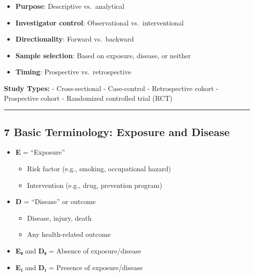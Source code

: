 \documentclass[
  letterpaper,
  DIV=11,
  numbers=noendperiod]{scrartcl}
\providecommand{\tightlist}{%
  \setlength{\itemsep}{0pt}\setlength{\parskip}{0pt}}
\begin{document}
\begin{itemize}
\tightlist
\item
  \textbf{Purpose}: Descriptive vs.~analytical
\item
  \textbf{Investigator control}: Observational vs.~interventional
\item
  \textbf{Directionality}: Forward vs.~backward
\item
  \textbf{Sample selection}: Based on exposure, disease, or neither
\item
  \textbf{Timing}: Prospective vs.~retrospective
\end{itemize}

\textbf{Study Types:} - Cross-sectional - Case-control - Retrospective
cohort - Prospective cohort - Randomized controlled trial (RCT)

\begin{center}\rule{0.5\linewidth}{0.5pt}\end{center}

\subsection{\texorpdfstring{{7} {Basic Terminology: Exposure and
Disease}}{7 Basic Terminology: Exposure and Disease}}\label{basic-terminology-exposure-and-disease}

\begin{itemize}
\tightlist
\item
  \textbf{E} = ``Exposure''

  \begin{itemize}
  \tightlist
  \item
    Risk factor (e.g., smoking, occupational hazard)
  \item
    Intervention (e.g., drug, prevention program)
  \end{itemize}
\item
  \textbf{D} = ``Disease'' or outcome

  \begin{itemize}
  \tightlist
  \item
    Disease, injury, death
  \item
    Any health-related outcome
  \end{itemize}
\item
  \textbf{E₀} and \textbf{D₀} = Absence of exposure/disease
\item
  \textbf{E₁} and \textbf{D₁} = Presence of exposure/disease
\end{itemize}
\end{document}
